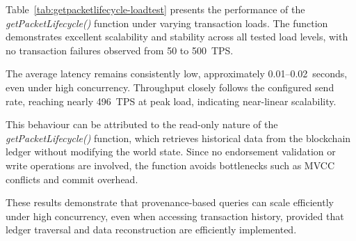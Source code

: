 \documentclass[12pt]{article}
\begin{document}
	Table~\ref{tab:getpacketlifecycle-loadtest} presents the performance of the \textit{getPacketLifecycle()} function under varying transaction loads. The function demonstrates excellent scalability and stability across all tested load levels, with no transaction failures observed from 50 to 500~TPS.
	
	The average latency remains consistently low, approximately 0.01--0.02~seconds, even under high concurrency. Throughput closely follows the configured send rate, reaching nearly 496~TPS at peak load, indicating near-linear scalability.
	
	This behaviour can be attributed to the read-only nature of the \textit{getPacketLifecycle()} function, which retrieves historical data from the blockchain ledger without modifying the world state. Since no endorsement validation or write operations are involved, the function avoids bottlenecks such as MVCC conflicts and commit overhead.
	
	These results demonstrate that provenance-based queries can scale efficiently under high concurrency, even when accessing transaction history, provided that ledger traversal and data reconstruction are efficiently implemented.
	
	
	\begin{table}[h]
		\centering
		\caption{Performance Results for \texttt{getPacketLifecycle} (Payload: 2908 bytes) under Varying Load}
		
		
		\label{tab:getpacketlifecycle-loadtest}
	\end{table}
	
\end{document}
